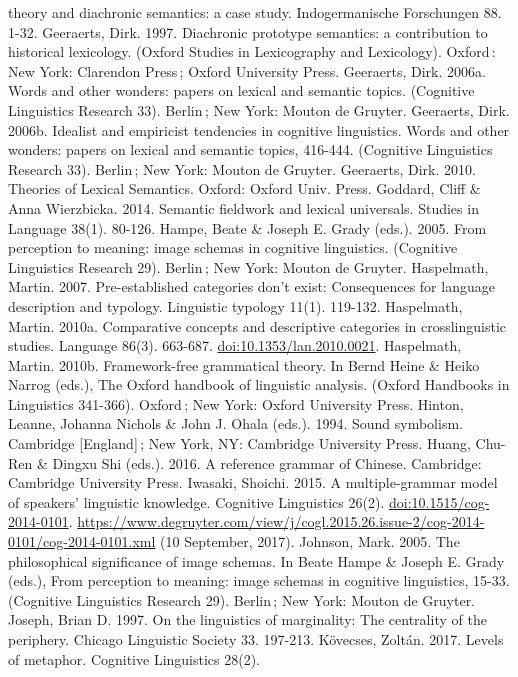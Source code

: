 theory and diachronic semantics: a case study. Indogermanische
Forschungen 88. 1-32. Geeraerts, Dirk. 1997. Diachronic prototype
semantics: a contribution to historical lexicology. (Oxford Studies in
Lexicography and Lexicology). Oxford\,: New York: Clarendon Press\,;
Oxford University Press. Geeraerts, Dirk. 2006a. Words and other
wonders: papers on lexical and semantic topics. (Cognitive Linguistics
Research 33). Berlin\,; New York: Mouton de Gruyter. Geeraerts, Dirk.
2006b. Idealist and empiricist tendencies in cognitive linguistics.
Words and other wonders: papers on lexical and semantic topics, 416-444.
(Cognitive Linguistics Research 33). Berlin\,; New York: Mouton de
Gruyter. Geeraerts, Dirk. 2010. Theories of Lexical Semantics. Oxford:
Oxford Univ. Press. Goddard, Cliff \& Anna Wierzbicka. 2014. Semantic
fieldwork and lexical universals. Studies in Language 38(1). 80-126.
Hampe, Beate \& Joseph E. Grady (eds.). 2005. From perception to
meaning: image schemas in cognitive linguistics. (Cognitive Linguistics
Research 29). Berlin\,; New York: Mouton de Gruyter. Haspelmath, Martin.
2007. Pre-established categories don't exist: Consequences for language
description and typology. Linguistic typology 11(1). 119-132.
Haspelmath, Martin. 2010a. Comparative concepts and descriptive
categories in crosslinguistic studies. Language 86(3). 663-687.
\url{doi:10.1353/lan.2010.0021}. Haspelmath, Martin. 2010b.
Framework-free grammatical theory. In Bernd Heine \& Heiko Narrog
(eds.), The Oxford handbook of linguistic analysis. (Oxford Handbooks in
Linguistics 341-366). Oxford\,; New York: Oxford University Press.
Hinton, Leanne, Johanna Nichols \& John J. Ohala (eds.). 1994. Sound
symbolism. Cambridge {[}England{]}\,; New York, NY: Cambridge University
Press. Huang, Chu-Ren \& Dingxu Shi (eds.). 2016. A reference grammar of
Chinese. Cambridge: Cambridge University Press. Iwasaki, Shoichi. 2015.
A multiple-grammar model of speakers' linguistic knowledge. Cognitive
Linguistics 26(2). \url{doi:10.1515/cog-2014-0101}.
\url{https://www.degruyter.com/view/j/cogl.2015.26.issue-2/cog-2014-0101/cog-2014-0101.xml}
(10 September, 2017). Johnson, Mark. 2005. The philosophical
significance of image schemas. In Beate Hampe \& Joseph E. Grady (eds.),
From perception to meaning: image schemas in cognitive linguistics,
15-33. (Cognitive Linguistics Research 29). Berlin\,; New York: Mouton
de Gruyter. Joseph, Brian D. 1997. On the linguistics of marginality:
The centrality of the periphery. Chicago Linguistic Society 33. 197-213.
Kövecses, Zoltán. 2017. Levels of metaphor. Cognitive Linguistics 28(2).
